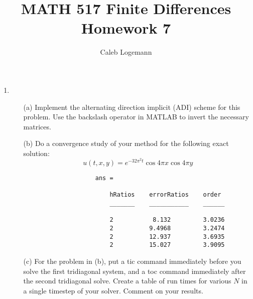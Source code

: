 \documentclass[11pt, oneside, titlepage]{article}
\title{MATH 517 Finite Differences Homework 7}
\author{Caleb Logemann}
\begin{document}
\maketitle

%
\begin{enumerate}
    \item %
        \begin{enumerate}
            \item[(a)]
                Implement the alternating direction implicit (ADI) scheme for
                this problem.
                Use the backslash operator in MATLAB to invert the necessary
                matrices.

                

            \item[(b)]
                Do a convergence study of your method for the following exact
                solution:
                \[
                    u(t, x, y) = e^{-32 \pi^2 t} \cos{4 \pi x} \cos{4\pi y}
                \]

                

                \begin{verbatim}
                    ans = 

                        hRatios    errorRatios    order 
                        _______    ___________    ______

                        2           8.132         3.0236
                        2          9.4968         3.2474
                        2          12.937         3.6935
                        2          15.027         3.9095
                \end{verbatim}


            \item[(c)]
                For the problem in (b), put a tic command immediately before you
                solve the first tridiagonal system, and a toc command
                immediately after the second tridiagonal solve.
                Create a table of run times for various $N$ in a single timestep 
                of your solver.
                Comment on your results.


\end{enumerate}
\end{enumerate}
\end{document}
